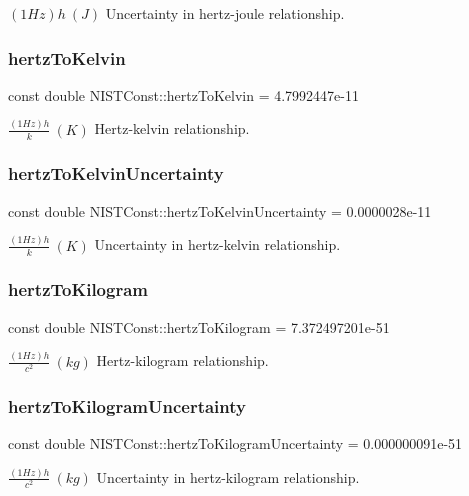 $(1 Hz)h \ (J)$ Uncertainty in hertz-\/joule relationship. \mbox{\label{group___hertz_gacda137a5d10ebba59b340d770802678f}} 
\subsubsection{\texorpdfstring{hertz\+To\+Kelvin}{hertzToKelvin}}
{\footnotesize\ttfamily const double N\+I\+S\+T\+Const\+::hertz\+To\+Kelvin = 4.\+7992447e-\/11}

$\frac{(1 Hz)h}{k} \ (K)$ Hertz-\/kelvin relationship. \mbox{\label{group___hertz_gacdec68d8c592492309f427551ae82a21}} 
\subsubsection{\texorpdfstring{hertz\+To\+Kelvin\+Uncertainty}{hertzToKelvinUncertainty}}
{\footnotesize\ttfamily const double N\+I\+S\+T\+Const\+::hertz\+To\+Kelvin\+Uncertainty = 0.\+0000028e-\/11}

$\frac{(1 Hz)h}{k} \ (K)$ Uncertainty in hertz-\/kelvin relationship. \mbox{\label{group___hertz_ga7b63758ab74cb80c236d4eacd5b89484}} 
\subsubsection{\texorpdfstring{hertz\+To\+Kilogram}{hertzToKilogram}}
{\footnotesize\ttfamily const double N\+I\+S\+T\+Const\+::hertz\+To\+Kilogram = 7.\+372497201e-\/51}

$\frac{(1 Hz)h}{c^2} \ (kg)$ Hertz-\/kilogram relationship. \mbox{\label{group___hertz_gab0659e6441271775cddea1c3bef17708}} 
\subsubsection{\texorpdfstring{hertz\+To\+Kilogram\+Uncertainty}{hertzToKilogramUncertainty}}
{\footnotesize\ttfamily const double N\+I\+S\+T\+Const\+::hertz\+To\+Kilogram\+Uncertainty = 0.\+000000091e-\/51}

$\frac{(1 Hz)h}{c^2} \ (kg)$ Uncertainty in hertz-\/kilogram relationship. 